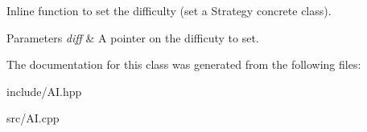 \-Inline function to set the difficulty (set a \-Strategy concrete class). 


\begin{DoxyParams}{\-Parameters}
{\em diff} & \-A pointer on the difficuty to set. \\
\hline
\end{DoxyParams}


\-The documentation for this class was generated from the following files\-:\begin{DoxyCompactItemize}
\item 
include/\-A\-I.\-hpp\item 
src/\-A\-I.\-cpp\end{DoxyCompactItemize}
